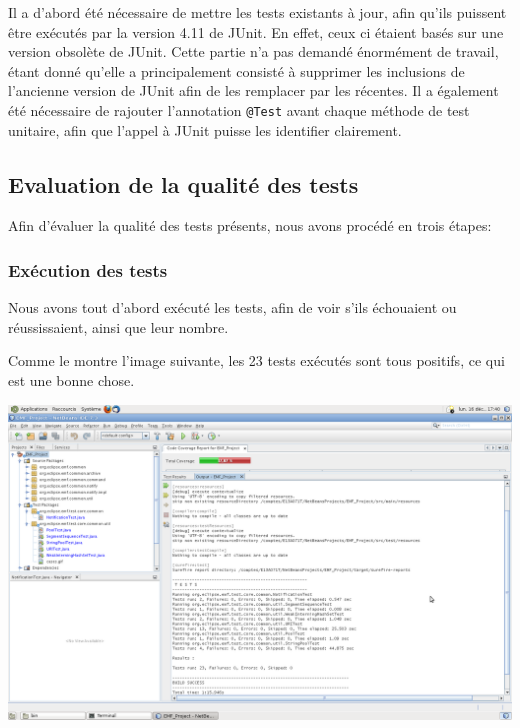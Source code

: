 \documentclass[a4paper]{article}
\begin{document}
		\vspace{0.5cm}

		Il a d'abord été nécessaire de mettre les tests existants à jour, afin qu'ils puissent être exécutés par la version 4.11 de JUnit. En effet, ceux ci étaient basés sur une version obsolète de JUnit. Cette partie n'a pas demandé énormément de travail, étant donné qu'elle a principalement consisté à supprimer les inclusions de l'ancienne version de JUnit afin de les remplacer par les récentes. Il a également été nécessaire de rajouter l'annotation \texttt{@Test} avant chaque méthode de test unitaire, afin que l'appel à JUnit puisse les identifier clairement.

		\subsection{Evaluation de la qualité des tests}

		\vspace{0.5cm}

		Afin d'évaluer la qualité des tests présents, nous avons procédé en trois étapes:

		\subsubsection{Exécution des tests}

		\vspace{0.5cm}

		Nous avons tout d'abord exécuté les tests, afin de voir s'ils échouaient ou réussissaient, ainsi que leur nombre.

		Comme le montre l'image suivante, les 23 tests exécutés sont tous positifs, ce qui est une bonne chose.

		\begin{center}
			\includegraphics[width=1.0\textwidth]{tests_execution.png}~\\
		\end{center}
\end{document}
